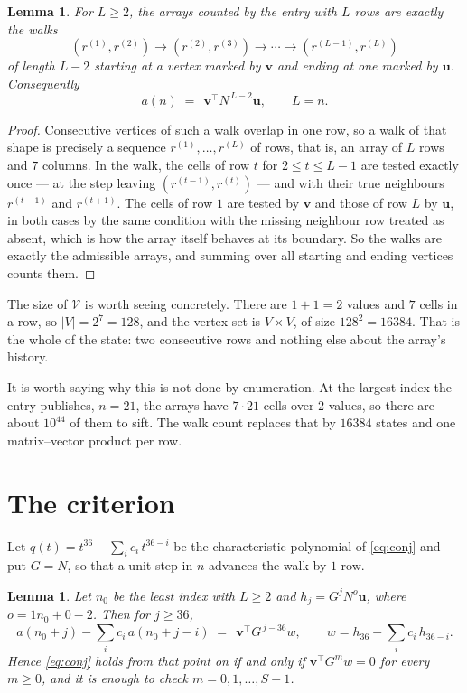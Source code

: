 \documentclass[11pt,a4paper]{article}
\theoremstyle{plain}
\newtheorem{lemma}[theorem]{Lemma}
\theoremstyle{definition}
\begin{document}
\begin{lemma}\label{lem:walk}
For $L\ge2$, the arrays counted by the entry with $L$ rows are exactly the walks
\[
(r^{(1)},r^{(2)})\to(r^{(2)},r^{(3)})\to\cdots\to(r^{(L-1)},r^{(L)})
\]
of length $L-2$ starting at a vertex marked by $\mathbf{v}$ and ending at one marked by
$\mathbf{u}$. Consequently
\[
a(n)\;=\;\,\mathbf{v}^{\!\top}N^{\,L-2}\mathbf{u},\qquad L=n .
\]
\end{lemma}

\begin{proof}
Consecutive vertices of such a walk overlap in one row, so a walk of that shape is
precisely a sequence $r^{(1)},\dots,r^{(L)}$ of rows, that is, an array of $L$ rows
and $7$ columns. In the walk, the cells of row $t$ for $2\le t\le L-1$ are tested
exactly once --- at the step leaving $(r^{(t-1)},r^{(t)})$ --- and with their true
neighbours $r^{(t-1)}$ and $r^{(t+1)}$. The cells of row $1$ are tested by
$\mathbf{v}$ and those of row $L$ by $\mathbf{u}$, in both cases by the same condition
with the missing neighbour row treated as absent, which is how the array itself behaves at
its boundary. So the walks are exactly the admissible arrays, and summing over all starting
and ending vertices counts them.
\end{proof}


The size of $\mathcal V$ is worth seeing concretely. There are $1+1=2$ values
and $7$ cells in a row, so $|V|=2^{7}=128$, and the vertex set is
$V\times V$, of size $128^2=16384$. That is the whole of the state: two consecutive
rows and nothing else about the array's history.

It is worth saying why this is not done by enumeration. At the largest index the entry
publishes, $n=21$, the arrays have $7\cdot21$ cells over
$2$ values, so there are about $10^{44}$ of them to sift. The
walk count replaces that by $16384$ states and one matrix--vector product per row.
\section{The criterion}

Let $q(t)=t^{36}-\sum_i c_i\,t^{36-i}$ be the characteristic polynomial of
\eqref{eq:conj} and put $G=N$, so that a unit step in $n$ advances the walk by
$1$ row.

\begin{lemma}\label{lem:crit}
Let $n_0$ be the least index with $L\ge2$ and $h_j=G^{j}N^{o}\mathbf{u}$, where
$o=1n_0+0-2$. Then for $j\ge36$,
\[
a(n_0+j)-\sum_i c_i\,a(n_0+j-i)\;=\;\,\mathbf{v}^{\!\top}G^{\,j-36}w,
\qquad w=h_{36}-\sum_i c_i\,h_{36-i} .
\]
Hence \eqref{eq:conj} holds from that point on if and only if
$\mathbf{v}^{\!\top}G^{m}w=0$ for every $m\ge0$, and it is enough to check
$m=0,1,\dots,S-1$.
\end{lemma}
\end{document}
